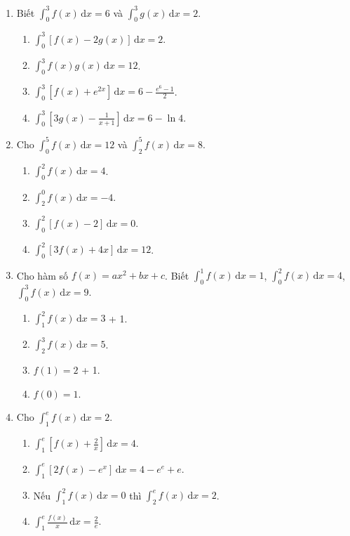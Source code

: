 \documentclass[12pt]{article}
\begin{document}
\begin{enumerate}[label=\textbf{Câu \arabic*.}]
		\item Biết $\displaystyle \int_0^3 f(x)\,\mathrm{d}x = 6$ và $\displaystyle \int_0^3 g(x)\,\mathrm{d}x = 2$.
		\begin{enumerate}[label=\alph*)]			\item $\displaystyle \int_0^3 [f(x) - 2g(x)]\,\mathrm{d}x = 2$.
			\item $\displaystyle \int_0^3 f(x)g(x)\,\mathrm{d}x = 12$.
			\item $\displaystyle \int_0^3 [f(x) + e^{2x}]\,\mathrm{d}x = 6 - \frac{e^6 - 1}{2}$.
			\item $\displaystyle \int_0^3 \left[3g(x) - \frac{1}{x+1}\right]\,\mathrm{d}x = 6 - \ln 4$.
\end{enumerate}
		
		\item Cho $\displaystyle \int_0^5 f(x)\,\mathrm{d}x = 12$ và $\displaystyle \int_2^5 f(x)\,\mathrm{d}x = 8$.
		\begin{enumerate}[label=\alph*)]			\item $\displaystyle \int_0^2 f(x)\,\mathrm{d}x = 4$.
			\item $\displaystyle \int_2^0 f(x)\,\mathrm{d}x = -4$.
			\item $\displaystyle \int_0^2 [f(x) - 2]\,\mathrm{d}x = 0$.
			\item $\displaystyle \int_0^2 [3f(x) + 4x]\,\mathrm{d}x = 12$.
\end{enumerate}
		
		\item Cho hàm số $f(x) = ax^2 + bx + c$. Biết $\displaystyle \int_0^1 f(x)\,\mathrm{d}x = 1$, $\displaystyle \int_0^2 f(x)\,\mathrm{d}x = 4$, $\displaystyle \int_0^3 f(x)\,\mathrm{d}x = 9$.
		\begin{enumerate}[label=\alph*)]			\item $\displaystyle \int_1^2 f(x)\,\mathrm{d}x = 3$ + 1.
			\item $\displaystyle \int_2^3 f(x)\,\mathrm{d}x = 5$.
			\item $f(1) = 2$ + 1.
			\item $f(0) = 1$.
\end{enumerate}
		
		\item Cho $\displaystyle \int_1^e f(x)\,\mathrm{d}x = 2$.
		\begin{enumerate}[label=\alph*)]			\item $\displaystyle \int_1^e \left[f(x) + \frac{2}{x}\right]\,\mathrm{d}x = 4$.
			\item $\displaystyle \int_1^e [2f(x) - e^x]\,\mathrm{d}x = 4 - e^e + e$.
			\item Nếu $\displaystyle \int_1^2 f(x)\,\mathrm{d}x = 0$ thì $\displaystyle \int_2^e f(x)\,\mathrm{d}x = 2$.
			\item $\displaystyle \int_1^e \frac{f(x)}{x}\,\mathrm{d}x = \frac{2}{e}$.
\end{enumerate}
		

\end{enumerate}
\end{document}
